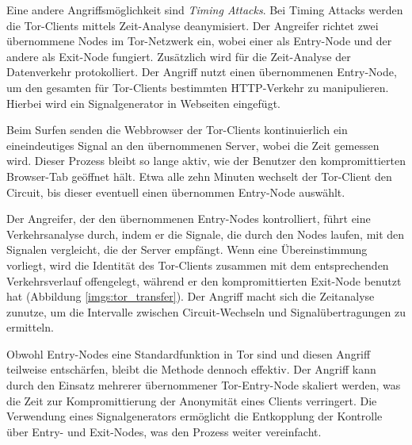Eine andere Angriffsmöglichkeit sind \textit{Timing Attacks}. Bei Timing Attacks werden die Tor-Clients mittels Zeit-Analyse deanymisiert. Der Angreifer richtet zwei übernommene Nodes im Tor-Netzwerk ein, wobei einer als Entry-Node und der andere als Exit-Node fungiert. Zusätzlich wird für die Zeit-Analyse der Datenverkehr protokolliert. Der Angriff nutzt einen übernommenen Entry-Node, um den gesamten für Tor-Clients bestimmten HTTP-Verkehr zu manipulieren. Hierbei wird ein Signalgenerator in Webseiten eingefügt.

Beim Surfen senden die Webbrowser der Tor-Clients kontinuierlich ein eineindeutiges Signal an den übernommenen Server, wobei die Zeit gemessen wird. Dieser Prozess bleibt so lange aktiv, wie der Benutzer den kompromittierten Browser-Tab geöffnet hält. Etwa alle zehn Minuten wechselt der Tor-Client den Circuit, bis dieser eventuell einen übernommen Entry-Node auswählt.

Der Angreifer, der den übernommenen Entry-Nodes kontrolliert, führt eine Verkehrsanalyse durch, indem er die Signale, die durch den Nodes laufen, mit den Signalen vergleicht, die der Server empfängt. Wenn eine Übereinstimmung vorliegt, wird die Identität des Tor-Clients zusammen mit dem entsprechenden Verkehrsverlauf offengelegt, während er den kompromittierten Exit-Node benutzt hat (Abbildung \ref{imgs:tor_transfer}). Der Angriff macht sich die Zeitanalyse zunutze, um die Intervalle zwischen Circuit-Wechseln und Signalübertragungen zu ermitteln.

Obwohl Entry-Nodes eine Standardfunktion in Tor sind und diesen Angriff teilweise entschärfen, bleibt die Methode dennoch effektiv. Der Angriff kann durch den Einsatz mehrerer übernommener Tor-Entry-Node skaliert werden, was die Zeit zur Kompromittierung der Anonymität eines Clients verringert. Die Verwendung eines Signalgenerators ermöglicht die Entkopplung der Kontrolle über Entry- und Exit-Nodes, was den Prozess weiter vereinfacht\cite{BrowserBasedAttacksOnTor}.

